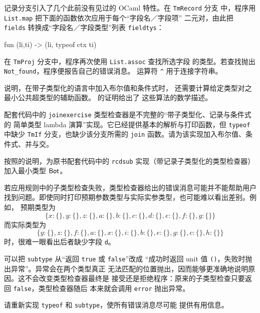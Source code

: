 记录分支引入了几个此前没有见过的 OCaml 特性。在 \texttt{TmRecord} 分支
中，程序用 \texttt{List.map} 把下面的函数依次应用于每个“字段名／字段项”
二元对，由此把 \texttt{fields} 转换成“字段名／字段类型”列表
\texttt{fieldtys}：

\begin{taplocamlcode}
fun (li,ti) -> (li, typeof ctx ti)
\end{taplocamlcode}
\taplocamlsyntaxonly

在 \texttt{TmProj} 分支中，程序再次使用 \texttt{List.assoc} 查找所选字段
的类型。若查找抛出 \texttt{Not\_found}，程序便报告自己的错误消息。
运算符 \texttt{\^{}} 用于连接字符串。

\begin{exercise}[
  \(\star\star\star\)]
\label{ex:17.3.1}
说明，在带子类型化的语言中加入布尔值和条件式时，
还需要计算给定类型对之最小公共超类型的辅助函数。
的证明给出了
这些算法的数学描述。

配套代码中的 \texttt{joinexercise} 类型检查器是不完整的“带子类型化、记录与条件式的
简单类型 lambda 演算”实现。它已经提供基本的解析与打印函数，但
\texttt{typeof} 中缺少 \texttt{TmIf} 分支，也缺少该分支所需的
\texttt{join} 函数。请为该实现加入布尔值、条件式、并与交。
\end{exercise}

\begin{exercise}[\(\star\star\)]
\label{ex:17.3.2}
按照的说明，为原书配套代码中的
\texttt{rcdsub} 实现（带记录子类型化的类型检查器）加入最小类型
\(\mathsf{Bot}\)。
\end{exercise}

\begin{exercise}[\(\star\star\), \(\nrightarrow\)]
\label{ex:17.3.3}
若应用规则中的子类型检查失败，类型检查器给出的错误消息可能并不能帮助用户
找到问题。即使同时打印预期参数类型与实际实参类型，也可能难以看出差别。例如，
预期类型为
\[
\{x:\{\},y:\{\},z:\{\},a:\{\},b:\{\},c:\{\},d:\{\},
  e:\{\},f:\{\},g:\{\}\}
\]
而实际类型为
\[
\{y:\{\},z:\{\},f:\{\},a:\{\},x:\{\},i:\{\},b:\{\},
  e:\{\},g:\{\},c:\{\},h:\{\}\}
\]
时，很难一眼看出后者缺少字段 \texttt{d}。

可以把 \texttt{subtype} 从“返回 \texttt{true} 或 \texttt{false}”改成
“成功时返回 unit 值 \texttt{()}，失败时抛出异常”。异常会在两个类型真正
无法匹配的位置抛出，因而能够更准确地说明原因。这不会改变类型检查器最终是
接受还是拒绝程序：原来的子类型检查只要返回 \texttt{false}，类型检查器随后
本来就会调用 \texttt{error} 抛出异常。

请重新实现 \texttt{typeof} 和 \texttt{subtype}，使所有错误消息尽可能
提供有用信息。
\end{exercise}


